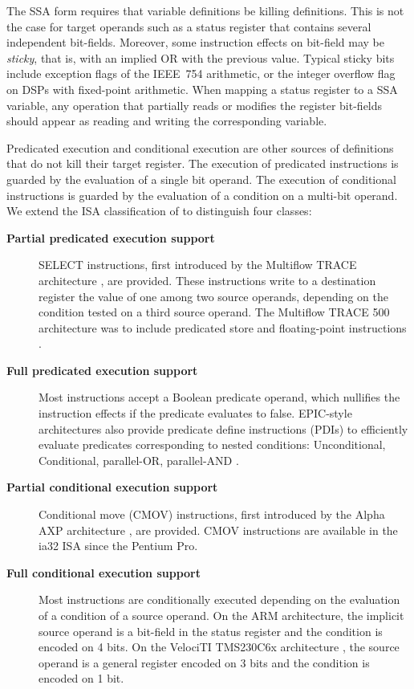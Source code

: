 The SSA form requires that variable definitions be killing definitions. This is not the case
for target operands such as a status register that contains several independent
bit-fields. Moreover, some instruction effects on bit-field may be \emph{sticky},
that is, with an implied OR with the previous value. Typical sticky bits include
exception flags of the IEEE~754 arithmetic, or the integer overflow flag on DSPs
with fixed-point arithmetic. When mapping a status register to a SSA variable,
any operation that partially reads or modifies the register bit-fields should
appear as reading and writing the corresponding variable.

Predicated execution and conditional execution are other sources of definitions
that do not kill their target register. The execution of predicated instructions
is guarded by the evaluation of a single bit operand. The execution of
conditional instructions is guarded by the evaluation of a condition on a
multi-bit operand. We extend the ISA classification of \cite{Mahlke:1995:ISCA}
to distinguish four classes: \begin{description}

\item[\textbf{Partial predicated execution support}] SELECT instructions, first
introduced by the Multiflow TRACE architecture \cite{Colwell:1987:ASPLOS}, are
provided. These instructions write to a destination register the value of one
among two source operands, depending on the condition tested on a third source
operand. The Multiflow TRACE 500 architecture was to include predicated store
and floating-point instructions \cite{Lowney:1993:JS}.

\item[\textbf{Full predicated execution support}] Most instructions accept a Boolean
predicate operand, which nullifies the instruction effects if the predicate
evaluates to false. EPIC-style architectures also provide predicate define
instructions (PDIs) to efficiently evaluate predicates corresponding to nested
conditions: Unconditional, Conditional, parallel-OR, parallel-AND
\cite{Gillies:1996:MICRO}.

\item[\textbf{Partial conditional execution support}] Conditional move (CMOV)
instructions, first introduced by the Alpha AXP architecture
\cite{Blickstein:1992:DTJ}, are provided. CMOV instructions are available in the
ia32 ISA since the Pentium Pro.

\item[\textbf{Full conditional execution support}] Most instructions are
conditionally executed depending on the evaluation of a condition of a source
operand. On the ARM architecture, the implicit source operand is a bit-field in
the status register and the condition is encoded on 4 bits. On the
VelociTI{\texttrademark} TMS230C6x architecture \cite{Seshan:1998:IEEESPM}, the
source operand is a general register encoded on 3 bits and the condition is
encoded on 1 bit.

\end{description}

